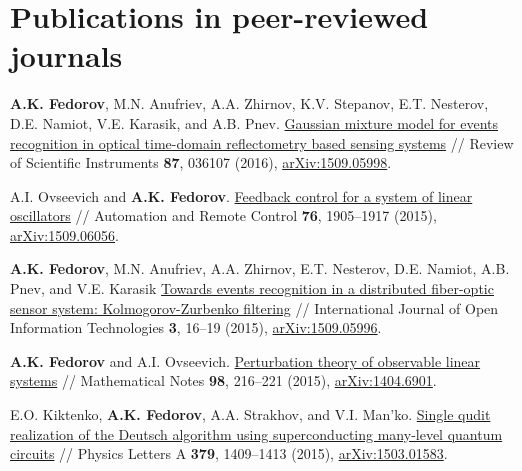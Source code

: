 \documentclass[10pt,a4paper,sans]{moderncv}
\begin{document}
	
	
\section{Publications in peer-reviewed journals}

	{\textbf{A.K. Fedorov}, M.N. Anufriev, A.A. Zhirnov, K.V. Stepanov, E.T. Nesterov, D.E. Namiot, V.E. Karasik, and A.B. Pnev.
	{\textcolor{blue}{\href{http://dx.doi.org/10.1063/1.4944417}{Gaussian mixture model for events recognition in optical time-domain reflectometry based sensing systems}}} //
	Review of Scientific Instruments \textbf{87}, 036107 (2016),
	{\textcolor{blue}{\href{http://arxiv.org/abs/1509.05998}{arXiv:1509.05998}}}.}

	{A.I. Ovseevich and \textbf{A.K. Fedorov}. 
	{\textcolor{blue}{\href{http://dx.doi.org/10.1134/S0005117915110016}{Feedback control for a system of linear oscillators}}} // 
	Automation and Remote Control \textbf{76}, 1905--1917 (2015),
	{\textcolor{blue}{\href{http://arxiv.org/abs/1509.06056}{arXiv:1509.06056}}}.}

	{\textbf{A.K. Fedorov}, M.N. Anufriev, A.A. Zhirnov, E.T. Nesterov, D.E. Namiot, A.B. Pnev, and V.E. Karasik 
	{\textcolor{blue}{\href{http://injoit.org/index.php/j1/article/view/232}{Towards events recognition in a distributed fiber-optic sensor system: Kolmogorov-Zurbenko filtering}}} // 
	International Journal of Open Information Technologies \textbf{3}, 16--19 (2015),
	{\textcolor{blue}{\href{http://arxiv.org/abs/1509.05996}{arXiv:1509.05996}}}.}

	{\textbf{A.K. Fedorov} and A.I. Ovseevich. 
	{\textcolor{blue}{\href{http://dx.doi.org/10.1134/S0001434615070226}{Perturbation theory of observable linear systems}}} // 
	Mathematical Notes \textbf{98}, 216--221 (2015),
	{\textcolor{blue}{\href{http://arxiv.org/abs/1404.6901}{arXiv:1404.6901}}}.}

	{E.O. Kiktenko, \textbf{A.K. Fedorov}, A.A. Strakhov, and V.I. Man'ko. 
	{\textcolor{blue}{\href{http://dx.doi.org/10.1016/j.physleta.2015.03.023}{Single qudit realization of the Deutsch algorithm using superconducting many-level quantum circuits}}} // 
	Physics Letters A \textbf{379}, 1409--1413 (2015),
	{\textcolor{blue}{\href{http://arxiv.org/abs/1503.01583}{arXiv:1503.01583}}}.} 
\end{document}
